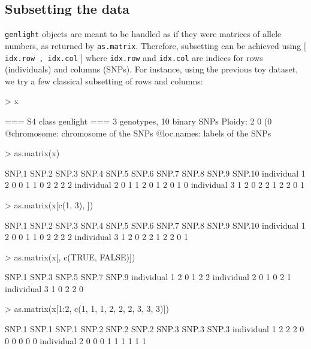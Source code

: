 \documentclass{article}
\begin{document}
\subsection{Subsetting the data}
\texttt{genlight} objects are meant to be handled as if they were matrices of allele numbers, as
returned by \texttt{as.matrix}.
Therefore, subsetting can be achieved using $[$ \texttt{idx.row , idx.col} $]$ where \texttt{idx.row}
and \texttt{idx.col} are indices for rows (individuals) and columns (SNPs).
For instance, using the previous toy dataset, we try a few classical subsetting of rows and columns:
\begin{Schunk}
\begin{Sinput}
> x
\end{Sinput}
\begin{Soutput}
 === S4 class genlight ===
 3 genotypes,  10 binary SNPs
 Ploidy: 2
 0 (0 %
 @chromosome: chromosome of the SNPs
 @loc.names: labels of the SNPs
\end{Soutput}
\begin{Sinput}
> as.matrix(x)
\end{Sinput}
\begin{Soutput}
             SNP.1 SNP.2 SNP.3 SNP.4 SNP.5 SNP.6 SNP.7 SNP.8 SNP.9 SNP.10
individual 1     2     0     0     1     1     0     2     2     2      2
individual 2     0     1     1     2     0     1     2     0     1      0
individual 3     1     2     0     2     2     1     2     2     0      1
\end{Soutput}
\begin{Sinput}
> as.matrix(x[c(1, 3), ])
\end{Sinput}
\begin{Soutput}
             SNP.1 SNP.2 SNP.3 SNP.4 SNP.5 SNP.6 SNP.7 SNP.8 SNP.9 SNP.10
individual 1     2     0     0     1     1     0     2     2     2      2
individual 3     1     2     0     2     2     1     2     2     0      1
\end{Soutput}
\begin{Sinput}
> as.matrix(x[, c(TRUE, FALSE)])
\end{Sinput}
\begin{Soutput}
             SNP.1 SNP.3 SNP.5 SNP.7 SNP.9
individual 1     2     0     1     2     2
individual 2     0     1     0     2     1
individual 3     1     0     2     2     0
\end{Soutput}
\begin{Sinput}
> as.matrix(x[1:2, c(1, 1, 1, 2, 2, 2, 3, 3, 3)])
\end{Sinput}
\begin{Soutput}
             SNP.1 SNP.1 SNP.1 SNP.2 SNP.2 SNP.2 SNP.3 SNP.3 SNP.3
individual 1     2     2     2     0     0     0     0     0     0
individual 2     0     0     0     1     1     1     1     1     1
\end{Soutput}
\end{Schunk}
\end{document}
